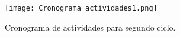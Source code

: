 \begin{figure}[H]
	\centering
	\texttt{[image: Cronograma\_actividades1.png]}
	\caption{Cronograma de actividades para segundo ciclo.}
	\label{fig1}
\end{figure}